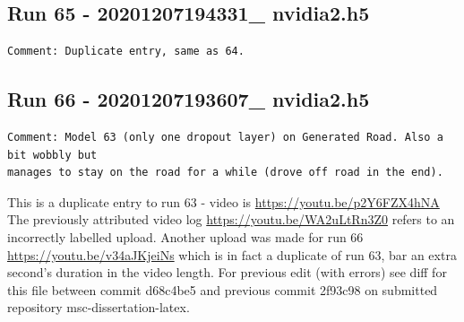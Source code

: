 \subsection{Run 65 - 20201207194331\_ nvidia2.h5 }
\label{app_res:65}
\begin{verbatim}
Comment: Duplicate entry, same as 64.
\end{verbatim}

\subsection{Run 66 - 20201207193607\_ nvidia2.h5}
\label{app_res:65}
\begin{verbatim}
Comment: Model 63 (only one dropout layer) on Generated Road. Also a bit wobbly but
manages to stay on the road for a while (drove off road in the end).
\end{verbatim}
This is a duplicate entry to run 63 - video is \url{https://youtu.be/p2Y6FZX4hNA}
The previously attributed video log \url{https://youtu.be/WA2uLtRn3Z0} refers to an incorrectly labelled upload. 
Another upload was made for run 66 \url{https://youtu.be/v34aJKjeiNs} which is in fact a duplicate of run 63, bar an extra second's duration in the video length.
For previous edit (with errors) see diff for this file  between commit d68c4be5 and previous commit 2f93c98 on submitted repository msc-dissertation-latex.

